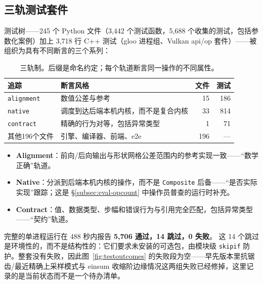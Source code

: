 \subsection{三轨测试套件}
\label{subsec:eval-tests}

测试树——245 个 Python 文件（3{,}442 个测试函数，5{,}688 个收集的测试，包括参数化案例）加上 3{,}718 行 C++ 测试（gloo 进程组、Vulkan api/op 套件）——被组织为具有不同断言的三个系列：

\begin{table}[H]
\centering
\caption{三轨制。后缀是命名约定；每个轨道断言同一操作的不同属性。}
\label{tab:testtracks}
\small
\begin{tabular}{llrr}
\toprule
追踪 & 断言风格 & 文件 & 测试 \\
\midrule
\texttt{alignment} & 数值公差与参考 & 15 & 186 \\
\texttt{native} & 调度到达后端本机内核，而不是复合内核 & 33 & 814 \\
\texttt{contract} & 精确的行为对等，包括异常类型 & 1 & 71 \\
\midrule
其他196个文件 & 引擎、编译器、前端、e2e & 196 & --- \\
\bottomrule
\end{tabular}
\end{table}

\begin{itemize}[leftmargin=1.2em]
\item \textbf{Alignment}：前向/后向输出与形状网格公差范围内的参考实现一致——“数学正确”轨道。
\item \textbf{Native}：分派到后端本机内核的操作，而不是 \texttt{Composite} 后备——“是否实际实现”跟踪；这是 \S\ref{subsec:eval-opcount} 中操作员普查的运行时补充。
\item \textbf{Contract}：值、数据类型、步幅和错误行为与引用完全匹配，包括异常类型——“契约”轨道。
\end{itemize}

完整的单进程运行在 488 秒内报告 \textbf{5{,}706 通过，14 跳过，0 失败}。 这 14 个跳过是环境性的，而不是结构性的：它们要求未安装的可选包，由模块级 \texttt{skipif} 防护。整套没有失败，因此图~\ref{fig:testoutcomes} 的失败段为空——早先版本里抗锯齿/最近精确上采样模式与 einsum 收缩阶边缘情况这两组失败已经修掉，这里记录的是当前状态而不是一个待办清单。

